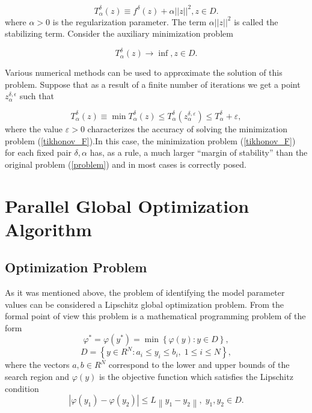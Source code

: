 \documentclass{svproc}
\begin{document}
\begin{equation}\label{formula_T}
T_\alpha^\delta(z) \equiv f^\delta(z) + \alpha ||z||^2, z \in D.
\end{equation}
where $\alpha > 0$ is the regularization parameter. The term $\alpha||z||^2$ is called the stabilizing term. Consider the auxiliary minimization problem

\begin{equation}
T_\alpha^\delta(z) \rightarrow \inf, z \in D. 
\label{tikhonov_F}
\end{equation}

Various numerical methods can be used to approximate the solution of this problem. Suppose that as a result of a finite number of iterations we get a point $z_\alpha^{\delta,\epsilon}$ such that

\begin{equation}
T_\alpha^\delta(z) \equiv \min T_{\alpha}^{\delta}(z) \leq T_{\alpha}^{\delta} (z_{\alpha}^{\delta,\varepsilon}) \leq T_{\alpha}^{\delta} + \varepsilon,
\end{equation}
where the value $\varepsilon > 0$ characterizes the accuracy of solving the minimization problem (\ref{tikhonov_F}).In this case, the minimization problem (\ref{tikhonov_F}) for each fixed pair $\delta, \alpha$ has, as a rule, a much larger ``margin of stability'' than the original problem (\ref{problem}) and in most cases is correctly posed.

\section{Parallel Global Optimization Algorithm}\label{Sec_GSA}

\subsection{Optimization Problem}\label{Sec_GO_Problem}

As it was mentioned above, the problem of identifying the model parameter values can be considered a Lipschitz global optimization problem. From the formal point of view this problem is a mathematical programming problem of the form
\begin{equation} \label{problemN}
 \varphi^* = \varphi(y^\ast)=\min{\left\{\varphi(y):y\in D\right\}},
 \end{equation}
\begin{equation} \label{D}
 D=\left\{y\in R^N: a_i\leq y_i \leq b_i, \;  1\leq i \leq N\right\},
 \end{equation}
where the vectors $a,b\in R^N$ correspond to the lower and upper bounds of the search region and $\varphi(y)$ is the objective function which satisfies the Lipschitz condition
\begin{equation}\label{Lip}
\left|\varphi(y_1)-\varphi(y_2)\right|\leq L\left\|y_1-y_2\right\|,\; y_1,y_2 \in D.
\end{equation}
\end{document}
